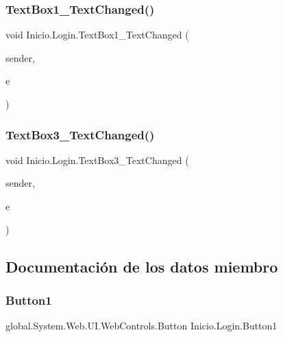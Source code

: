 \subsubsection{\texorpdfstring{TextBox1\_TextChanged()}{TextBox1\_TextChanged()}}
{\footnotesize\ttfamily void Inicio.\+Login.\+Text\+Box1\+\_\+\+Text\+Changed (\begin{DoxyParamCaption}\item[{object}]{sender,  }\item[{Event\+Args}]{e }\end{DoxyParamCaption})\hspace{0.3cm}{\ttfamily [protected]}}

\mbox{\label{classInicio_1_1Login_a332bc2333d4b1baf24c09b02f343734b}} 
\subsubsection{\texorpdfstring{TextBox3\_TextChanged()}{TextBox3\_TextChanged()}}
{\footnotesize\ttfamily void Inicio.\+Login.\+Text\+Box3\+\_\+\+Text\+Changed (\begin{DoxyParamCaption}\item[{object}]{sender,  }\item[{Event\+Args}]{e }\end{DoxyParamCaption})\hspace{0.3cm}{\ttfamily [protected]}}



\subsection{Documentación de los datos miembro}
\mbox{\label{classInicio_1_1Login_a538759688d96a18839d8cf330a38b4e0}} 
\subsubsection{\texorpdfstring{Button1}{Button1}}
{\footnotesize\ttfamily global.\+System.\+Web.\+U\+I.\+Web\+Controls.\+Button Inicio.\+Login.\+Button1\hspace{0.3cm}{\ttfamily [protected]}}



